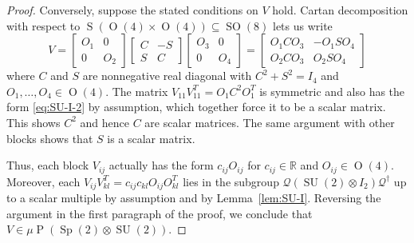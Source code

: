 \documentclass[reqno]{amsart}
\theoremstyle{definition} \newtheorem{example}[theorem]{Example}
\newcommand{\RR}{\mathbb{R}}
\newcommand{\SU}{\operatorname{SU}}
\newcommand{\SO}{\operatorname{SO}}
\newcommand{\Sp}{\operatorname{Sp}}
\renewcommand{\O}{\operatorname{O}}
\renewcommand{\P}{\operatorname{P}}
\renewcommand{\S}{\operatorname{S}}
\newcommand{\Q}{\mathcal{Q}}
\begin{document}
\begin{proof}
Conversely, suppose the stated conditions on $V$ hold. Cartan decomposition with respect to $\S(\O(4) \times \O(4)) \subseteq \SO(8)$ lets us write
\begin{equation*}
V = \begin{bmatrix} O_1 & 0 \\ 0 & O_2 \end{bmatrix} \begin{bmatrix} C & -S \\ S & C \end{bmatrix} \begin{bmatrix} O_3 & 0 \\ 0 & O_4 \end{bmatrix} = \begin{bmatrix} O_1 C O_3 & -O_1 S O_4 \\ O_2 C O_3 & O_2 S O_4 \end{bmatrix}
\end{equation*}
where $C$ and $S$ are nonnegative real diagonal with $C^2+S^2=I_4$ and $O_1, \ldots, O_4 \in \O(4)$. The matrix $V_{11}V_{11}^T = O_1 C^2 O_1^T$ is symmetric and also has the form \eqref{eq:SU-I-2} by assumption, which together force it to be a scalar matrix. This shows $C^2$ and hence $C$ are scalar matrices. The same argument with other blocks shows that $S$ is a scalar matrix.

Thus, each block $V_{ij}$ actually has the form $c_{ij}O_{ij}$ for $c_{ij} \in \RR$ and $O_{ij} \in \O(4)$. Moreover, each $V_{ij}V_{kl}^T = c_{ij}c_{kl} O_{ij}O_{kl}^T$ lies in the subgroup $\Q(\SU(2) \otimes I_2)\Q^\dagger$ up to a scalar multiple by assumption and by Lemma~\ref{lem:SU-I}. Reversing the argument in the first paragraph of the proof, we conclude that $V \in \mu \P(\Sp(2) \otimes \SU(2))$.
\end{proof}
\end{document}
